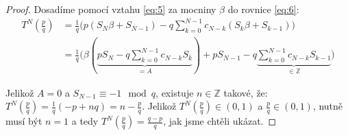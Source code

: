\documentclass{article}
\theoremstyle{definition}
\theoremstyle{definition}
\theoremstyle{remark}
\numberwithin{equation}{section}
\begin{document}
\begin{proof}
	Dosadíme pomocí vztahu \eqref{eq:5} za mocniny $\beta$ do rovnice \eqref{eq:6}:
	\begin{align*}
		T^N(\tfrac{p}{q}) & = \frac{1}{q}\bigg(p(S_N \beta + S_{N - 1}) - q\sum^{N - 1}_{k = 0}c_{N - k}(S_k \beta + S_{k - 1})\bigg)                                                                         \\
		                  & = \frac{1}{q}\bigg(\beta (\underbrace{pS_N - q\sum^{N - 1}_{k = 0}c_{N - k}S_k}_{= A}) + pS_{N - 1} - q\underbrace{\sum^{N - 1}_{k = 0}c_{N - k}S_{k - 1}}_{\in \mathbb{Z}}\bigg)
	\end{align*}

	Jelikož $A = 0$ a $S_{N - 1} \equiv -1 \mod q$, existuje $n \in \mathbb{Z}$ takové, že:
	$T^N(\tfrac{p}{q}) = \tfrac{1}{q}(-p + nq) = n - \tfrac{p}{q}$. Jelikož $T^N(\frac{p}{q}) \in (0, 1)$ a $\frac{p}{q} \in (0, 1)$, nutně musí být $n = 1$ a tedy $T^N(\frac{p}{q}) = \frac{q - p}{q}$, jak jsme chtěli ukázat.
\end{proof}
\newpage
\end{document}
